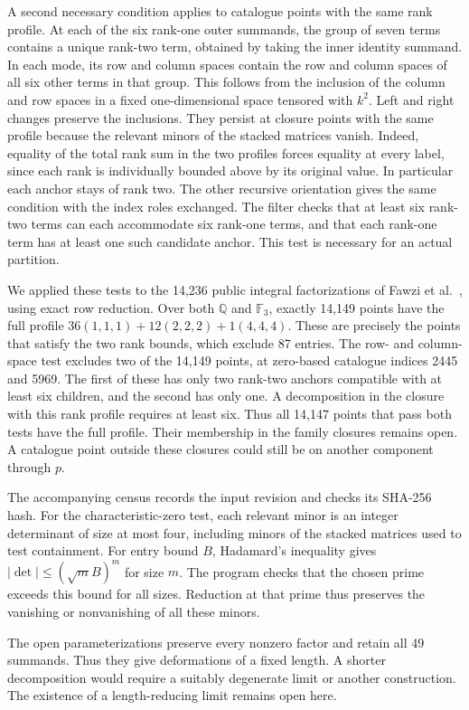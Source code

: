 \documentclass[11pt]{amsart}
\newcommand{\F}{\mathbb F}
\newcommand{\Q}{\mathbb Q}
\begin{document}
A second necessary condition applies to catalogue points with the
same rank profile. At each of the six rank-one outer summands, the
group of seven terms contains a unique rank-two term, obtained by
taking the inner identity summand. In each mode, its row and column
spaces contain the row and column spaces of all six other terms in
that group. This follows from the inclusion of the column and row
spaces in a fixed one-dimensional space tensored with $k^2$.
Left and right changes preserve the inclusions. They persist at
closure points with the same profile because the relevant minors of
the stacked matrices vanish. Indeed, equality of the total rank sum
in the two profiles forces equality at every label, since each rank
is individually bounded above by its original value. In particular
each anchor stays of rank two.
The other recursive orientation gives the same condition with the
index roles exchanged. The filter checks that at least six rank-two
terms can each accommodate six rank-one terms, and that each rank-one
term has at least one such candidate anchor. This test is necessary
for an actual partition.

We applied these tests to the 14,236 public integral factorizations
of Fawzi et al.\ \cite{alpha}, using exact row reduction. Over
both $\Q$ and $\F_3$, exactly 14,149 points have the full profile
$36(1,1,1)+12(2,2,2)+1(4,4,4)$. These are precisely the points
that satisfy the two rank bounds, which exclude 87 entries.
The row- and column-space test
excludes two of the 14,149 points, at zero-based catalogue indices
2445 and 5969. The first of these has only two
rank-two anchors compatible with at least six children, and the
second has only one. A decomposition in the closure with this rank
profile requires at least six. Thus all 14,147 points that pass
both tests have the full profile. Their membership in the family
closures remains open. A catalogue point outside these closures
could still be on another component through $p$.

The accompanying census records the input revision and checks its
SHA-256 hash. For the characteristic-zero test, each relevant
minor is an integer determinant of size at most four, including
minors of the stacked matrices used to test containment. For
entry bound $B$, Hadamard's inequality gives
$|\det|\le(\sqrt{m}B)^m$ for size $m$. The program checks that
the chosen prime exceeds this bound for all sizes. Reduction at
that prime thus preserves the vanishing or nonvanishing of all
these minors.

The open parameterizations preserve every nonzero factor and retain
all 49 summands. Thus they give deformations of a fixed length.
A shorter decomposition would require a suitably degenerate limit
or another construction. The existence of a length-reducing limit
remains open here.
\end{document}
